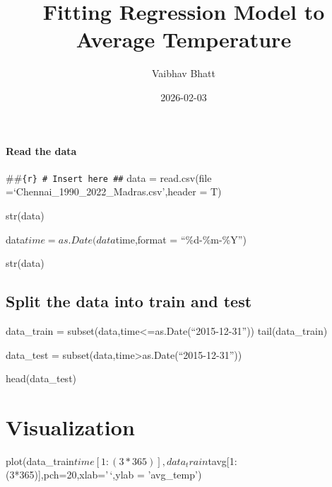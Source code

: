 \documentclass[
]{article}
\title{Fitting Regression Model to Average Temperature}
\author{Vaibhav Bhatt}
\date{2026-02-03}
\begin{document}
\maketitle

\paragraph{Read the data}\label{read-the-data}

\#\#\texttt{\{r\}\ \#\ Insert\ here\ \#\#} data = read.csv(file
=`Chennai\_1990\_2022\_Madras.csv',header = T)

str(data)

data\(time = as.Date(data\)time,format = ``\%d-\%m-\%Y'')

str(data)

\subsection{Split the data into train and
test}\label{split-the-data-into-train-and-test}

data\_train = subset(data,time\textless=as.Date(``2015-12-31''))
tail(data\_train)

data\_test = subset(data,time\textgreater as.Date(``2015-12-31''))

head(data\_test)

\section{Visualization}\label{visualization}

plot(data\_train\(time[1:(3*365)],data_train\)tavg{[}1:(3*365){]},pch=20,xlab='\,`,ylab
= 'avg\_temp')
\end{document}
